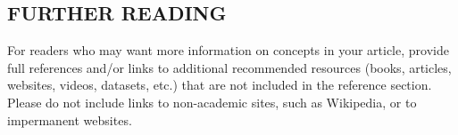 \documentclass[12pt]{article}
\begin{document}

\nocite{coulson1960present}
\nocite{hoffmann2008predicting}
\nocite{koros1987separation}
\nocite{malrieu1998quantum}
\nocite{perdew2009some}
\nocite{shaik2007my}


\subsection*{\sffamily \Large FURTHER READING}
For readers who may want more information on concepts in your article, provide full references and/or links to additional recommended resources (books, articles, websites, videos, datasets, etc.) that are not included in the reference section. Please do not include links to non-academic sites, such as Wikipedia, or to impermanent websites.
\end{document}
